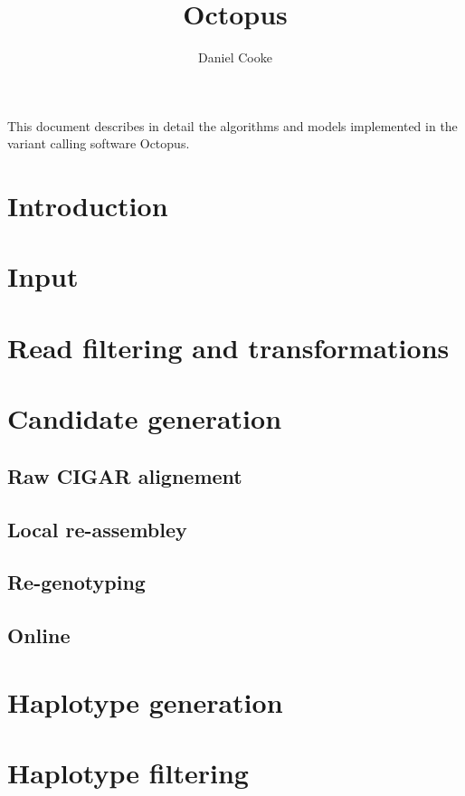 \documentclass{article}
\title{Octopus}
\author{Daniel Cooke}
\date{}
\begin{document}
\maketitle

This document describes in detail the algorithms and models implemented in the variant calling software Octopus.

\tableofcontents

\section{Introduction}

\section{Input}

\section{Read filtering and transformations}

\section{Candidate generation}

\subsection{Raw CIGAR alignement}

\subsection{Local re-assembley}

\subsection{Re-genotyping}

\subsection{Online}

\section{Haplotype generation}

\section{Haplotype filtering}
\end{document}
